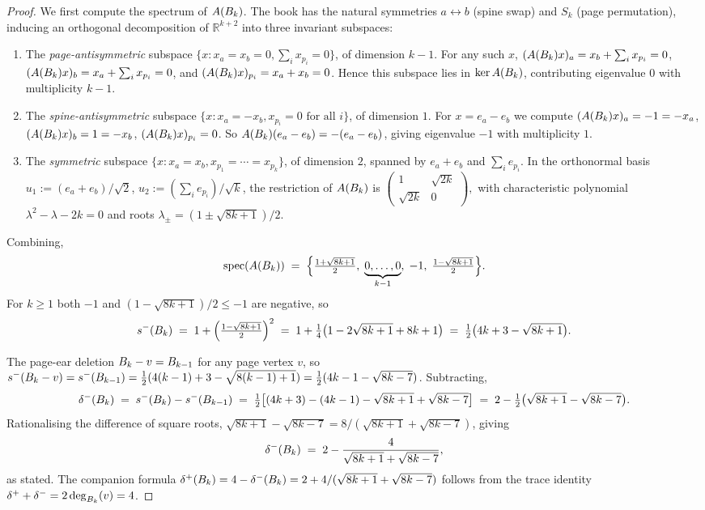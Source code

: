 \begin{proof}
We first compute the spectrum of $A(B_{k})$. The book has the natural
symmetries $a \leftrightarrow b$ (spine swap) and $S_{k}$
(page permutation), inducing an orthogonal decomposition of
$\mathbb{R}^{k+2}$ into three invariant subspaces:
\begin{enumerate}
\item The \emph{page-antisymmetric} subspace
$\{x : x_{a} = x_{b} = 0, \sum_{i} x_{p_{i}} = 0\}$, of dimension
$k - 1$. For any such $x$, $(A(B_{k}) x)_{a} = x_{b} + \sum_{i} x_{p_{i}} = 0$,
$(A(B_{k}) x)_{b} = x_{a} + \sum_{i} x_{p_{i}} = 0$, and
$(A(B_{k}) x)_{p_{i}} = x_{a} + x_{b} = 0$. Hence this subspace lies
in $\ker A(B_{k})$, contributing eigenvalue $0$ with multiplicity
$k - 1$.

\item The \emph{spine-antisymmetric} subspace
$\{x : x_{a} = -x_{b}, x_{p_{i}} = 0 \text{ for all } i\}$, of
dimension $1$. For $x = e_{a} - e_{b}$ we compute
$(A(B_{k}) x)_{a} = -1 = -x_{a}$, $(A(B_{k}) x)_{b} = 1 = -x_{b}$,
$(A(B_{k}) x)_{p_{i}} = 0$. So $A(B_{k})(e_{a} - e_{b}) = -(e_{a} - e_{b})$,
giving eigenvalue $-1$ with multiplicity $1$.

\item The \emph{symmetric} subspace
$\{x : x_{a} = x_{b}, x_{p_{1}} = \cdots = x_{p_{k}}\}$, of
dimension $2$, spanned by $e_{a} + e_{b}$ and $\sum_{i} e_{p_{i}}$.
In the orthonormal basis
$u_{1} := (e_{a} + e_{b})/\sqrt{2}$,
$u_{2} := (\sum_{i} e_{p_{i}})/\sqrt{k}$, the restriction of
$A(B_{k})$ is
$
\begin{pmatrix}
1 & \sqrt{2k} \\
\sqrt{2k} & 0
\end{pmatrix},
$
with characteristic polynomial $\lambda^{2} - \lambda - 2k = 0$ and
roots $\lambda_{\pm} = (1 \pm \sqrt{8k + 1})/2$.
\end{enumerate}
Combining,
\[
\operatorname{spec}(A(B_{k})) \;=\;
\Bigl\{ \tfrac{1 + \sqrt{8k+1}}{2},\; \underbrace{0, \ldots, 0}_{k-1},\;
-1,\; \tfrac{1 - \sqrt{8k+1}}{2} \Bigr\}.
\]
For $k \ge 1$ both $-1$ and $(1 - \sqrt{8k+1})/2 \le -1$ are
negative, so
\[
s^{-}(B_{k}) \;=\; 1 + \left(\tfrac{1 - \sqrt{8k+1}}{2}\right)^{2}
\;=\; 1 + \tfrac{1}{4}\bigl(1 - 2\sqrt{8k+1} + 8k + 1\bigr)
\;=\; \tfrac{1}{2}\bigl(4k + 3 - \sqrt{8k+1}\bigr).
\]

The page-ear deletion $B_{k} - v = B_{k-1}$ for any page vertex $v$, so
$s^{-}(B_{k} - v) = s^{-}(B_{k-1}) = \tfrac{1}{2}(4(k-1) + 3 - \sqrt{8(k-1)+1})
= \tfrac{1}{2}(4k - 1 - \sqrt{8k-7})$. Subtracting,
\[
\delta^{-}(B_{k}) \;=\; s^{-}(B_{k}) - s^{-}(B_{k-1})
\;=\; \tfrac{1}{2}\bigl[(4k + 3) - (4k - 1) - \sqrt{8k+1} + \sqrt{8k-7}\bigr]
\;=\; 2 - \tfrac{1}{2}\bigl(\sqrt{8k+1} - \sqrt{8k-7}\bigr).
\]
Rationalising the difference of square roots,
$\sqrt{8k+1} - \sqrt{8k-7} = 8/(\sqrt{8k+1} + \sqrt{8k-7})$, giving
\[
\delta^{-}(B_{k}) \;=\; 2 - \frac{4}{\sqrt{8k+1} + \sqrt{8k-7}},
\]
as stated. The companion formula
$\delta^{+}(B_{k}) = 4 - \delta^{-}(B_{k}) = 2 + 4/(\sqrt{8k+1} + \sqrt{8k-7})$
follows from the trace identity $\delta^{+} + \delta^{-} = 2 \deg_{B_{k}}(v) = 4$.


\end{proof}
